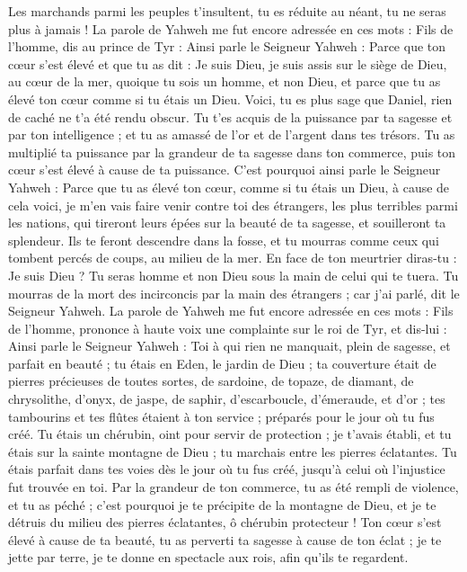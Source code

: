 \begin{multicols}{2}
Les marchands parmi les peuples t'insultent, tu es réduite au néant, tu ne seras plus à jamais !
\VerseOne{}La parole de Yahweh me fut encore adressée en ces mots :
Fils de l’homme, dis au prince de Tyr : Ainsi parle le Seigneur Yahweh : Parce que ton cœur s'est élevé et que tu as dit : Je suis Dieu, je suis assis sur le siège de Dieu, au cœur de la mer, quoique tu sois un homme, et non Dieu, et parce que tu as élevé ton cœur comme si tu étais un Dieu.
Voici, tu es plus sage que Daniel, rien de caché ne t'a été rendu obscur.
Tu t'es acquis de la puissance par ta sagesse et par ton intelligence ; et tu as amassé de l'or et de l'argent dans tes trésors\FTNT{}.
Tu as multiplié ta puissance par la grandeur de ta sagesse dans ton commerce, puis ton cœur s'est élevé à cause de ta puissance.
C'est pourquoi ainsi parle le Seigneur Yahweh : Parce que tu as élevé ton cœur, comme si tu étais un Dieu,
à cause de cela voici, je m'en vais faire venir contre toi des étrangers, les plus terribles parmi les nations, qui tireront leurs épées sur la beauté de ta sagesse, et souilleront ta splendeur.
Ils te feront descendre dans la fosse, et tu mourras comme ceux qui tombent percés de coups, au milieu de la mer.
En face de ton meurtrier diras-tu : Je suis Dieu ? Tu seras homme et non Dieu sous la main de celui qui te tuera.
Tu mourras de la mort des incirconcis par la main des étrangers ; car j'ai parlé, dit le Seigneur Yahweh.
La parole de Yahweh me fut encore adressée en ces mots :
Fils de l’homme, prononce à haute voix une complainte sur le roi de Tyr, et dis-lui : Ainsi parle le Seigneur Yahweh : Toi à qui rien ne manquait, plein de sagesse, et parfait en beauté ;
tu étais en Eden, le jardin de Dieu ; ta couverture était de pierres précieuses de toutes sortes, de sardoine, de topaze, de diamant, de chrysolithe, d'onyx, de jaspe, de saphir, d'escarboucle, d'émeraude, et d'or ; tes tambourins et tes flûtes étaient à ton service ; préparés pour le jour où tu fus créé.
Tu étais un chérubin, oint pour servir de protection ; je t'avais établi, et tu étais sur la sainte montagne de Dieu ; tu marchais entre les pierres éclatantes.
Tu étais parfait dans tes voies dès le jour où tu fus créé, jusqu'à celui où l’injustice fut trouvée en toi.
Par la grandeur de ton commerce\FTNT{}, tu as été rempli de violence, et tu as péché ; c'est pourquoi je te précipite de la montagne de Dieu\FTNT{}, et je te détruis du milieu des pierres éclatantes, ô chérubin protecteur !
Ton cœur s'est élevé à cause de ta beauté, tu as perverti ta sagesse à cause de ton éclat ; je te jette par terre, je te donne en spectacle aux rois, afin qu'ils te regardent.

\end{multicols}
